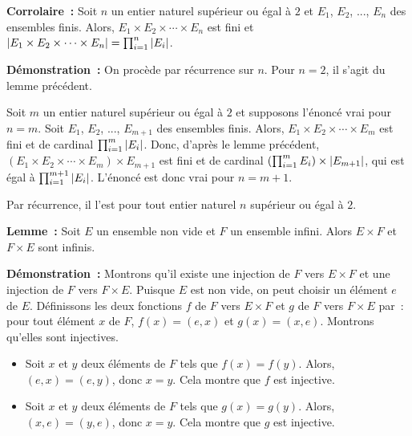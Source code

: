 \done

\medskip

\noindent\textbf{Corrolaire :} Soit $n$ un entier naturel supérieur ou égal à $2$ et $E_1$, $E_2$, ..., $E_n$ des ensembles finis.
    Alors, $E_1 \times E_2 \times \cdots \times E_n$ est fini et $\left\lvert E_1 \times E_2 \times \cdots \times E_n \right\rvert = \prod_{i=1}^n \left\lvert E_i \right\rvert$.

\medskip

\noindent\textbf{Démonstration :} On procède par récurrence sur $n$. 
    Pour $n = 2$, il s'agit du lemme précédent.

    Soit $m$ un entier naturel supérieur ou égal à $2$ et supposons l'énoncé vrai pour $n=m$. 
    Soit $E_1$, $E_2$, ..., $E_{m+1}$ des ensembles finis. 
    Alors, $E_1 \times E_2 \times \cdots \times E_m$ est fini et de cardinal $\prod_{i=1}^m \left\lvert E_i \right\rvert$.
    Donc, d'après le lemme précédent, $\left( E_1 \times E_2 \times \cdots \times E_m \right) \times E_{m+1}$ est fini et de cardinal $\left( \prod_{i=1}^m E_i \right) \times \left\lvert E_{m+1} \right\rvert$, qui est égal à $\prod_{i=1}^{m+1} \left\lvert E_i \right\rvert$.
    L'énoncé est donc vrai pour $n = m+1$. 

    Par récurrence, il l'est pour tout entier naturel $n$ supérieur ou égal à $2$.

    \done

\medskip

\noindent\textbf{Lemme :} Soit $E$ un ensemble non vide et $F$ un ensemble infini.
    Alors $E \times F$ et $F \times E$ sont infinis.

\medskip

\noindent\textbf{Démonstration :} Montrons qu'il existe une injection de $F$ vers $E \times F$ et une injection de $F$ vers $F \times E$.
    Puisque $E$ est non vide, on peut choisir un élément $e$ de $E$. 
    Définissons les deux fonctions $f$ de $F$ vers $E \times F$ et $g$ de $F$ vers $F \times E$ par : pour tout élément $x$ de $F$, $f(x) = (e,x)$ et $g(x) = (x,e)$. 
    Montrons qu'elles sont injectives. 
    \begin{itemize}[nosep]
        \item Soit $x$ et $y$ deux éléments de $F$ tels que $f(x) = f(y)$.
            Alors, $(e,x) = (e,y)$, donc $x = y$.
            Cela montre que $f$ est injective.
        \item Soit $x$ et $y$ deux éléments de $F$ tels que $g(x) = g(y)$.
            Alors, $(x,e) = (y,e)$, donc $x = y$.
            Cela montre que $g$ est injective.
    \end{itemize}

